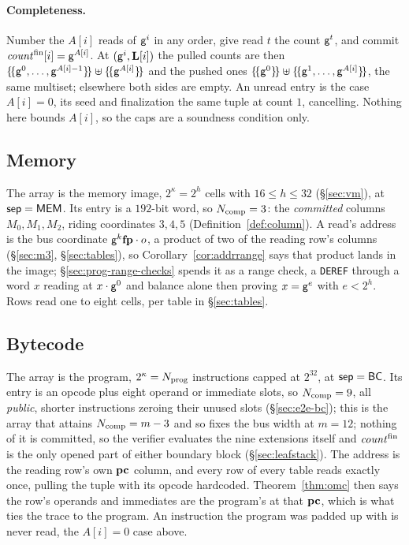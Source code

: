 \paragraph{Completeness.} Number the $A[i]$ reads of $\mathsf{g}^{i}$ in any order, give read $t$ the count $\mathsf{g}^{t}$, and commit $\mathit{count}^{\mathrm{fin}}[i]=\mathsf{g}^{A[i]}$. At $(\mathsf{g}^{i},\mathbf{L}[i])$ the pulled counts are then $\{\!\{\mathsf{g}^{0},\dots,\mathsf{g}^{A[i]-1}\}\!\}\uplus\{\!\{\mathsf{g}^{A[i]}\}\!\}$ and the pushed ones $\{\!\{\mathsf{g}^{0}\}\!\}\uplus\{\!\{\mathsf{g}^{1},\dots,\mathsf{g}^{A[i]}\}\!\}$, the same multiset; elsewhere both sides are empty. An unread entry is the case $A[i]=0$, its seed and finalization the same tuple at count $1$, cancelling. Nothing here bounds $A[i]$, so the caps are a soundness condition only.

\subsection{Memory}\label{sec:memchan}

The array is the memory image, $2^{\kappa}=2^{h}$ cells with $16\le h\le32$ (\S\ref{sec:vm}), at $\mathsf{sep}=\mathsf{MEM}$. Its entry is a $192$-bit word, so $N_{\mathrm{comp}}=3$: the \emph{committed} columns $M_0,M_1,M_2$, riding coordinates $3,4,5$ (Definition~\ref{def:column}). A read's address is the bus coordinate $\mathsf{g}^{k}\mathbf{fp}\cdot o$, a product of two of the reading row's columns (\S\ref{sec:m3}, \S\ref{sec:tables}), so Corollary~\ref{cor:addrrange} says that product lands in the image; \S\ref{sec:prog-range-checks} spends it as a range check, a \texttt{DEREF} through a word $x$ reading at $x\cdot\mathsf{g}^{0}$ and balance alone then proving $x=\mathsf{g}^{e}$ with $e<2^{h}$. Rows read one to eight cells, per table in \S\ref{sec:tables}.

\subsection{Bytecode}\label{sec:bytecode}

The array is the program, $2^{\kappa}=N_{\mathrm{prog}}$ instructions capped at $2^{32}$, at $\mathsf{sep}=\mathsf{BC}$. Its entry is an opcode plus eight operand or immediate slots, so $N_{\mathrm{comp}}=9$, all \emph{public}, shorter instructions zeroing their unused slots (\S\ref{sec:e2e-bc}); this is the array that attains $N_{\mathrm{comp}}=m-3$ and so fixes the bus width at $m=12$; nothing of it is committed, so the verifier evaluates the nine extensions itself and $\mathit{count}^{\mathrm{fin}}$ is the only opened part of either boundary block (\S\ref{sec:leafstack}). The address is the reading row's own $\mathbf{pc}$ column, and every row of every table reads exactly once, pulling the tuple with its opcode hardcoded. Theorem~\ref{thm:omc} then says the row's operands and immediates are the program's at that $\mathbf{pc}$, which is what ties the trace to the program. An instruction the program was padded up with is never read, the $A[i]=0$ case above.

